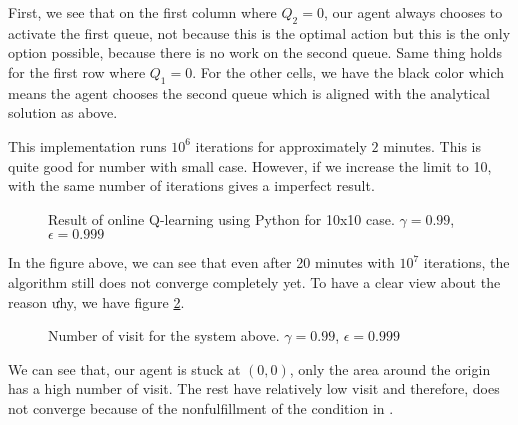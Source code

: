 \documentclass[
  a4paper, xcolor = usenames,dvipsnames]{article}
\begin{document}
First, we see that on the first column where \(Q_{2} = 0\), our agent always chooses to activate the first queue, not because this is the optimal action but this is the only option possible, because there is no work on the second queue. Same thing holds for the first row where \(Q_{1} = 0\). For the other cells, we have the black color which means the agent chooses the second queue which is aligned with the analytical solution as above.

This implementation runs \(10^6\) iterations for approximately \(2\) minutes. This is quite good for number with small case. However, if we increase the limit to 10, with the same number of iterations gives a imperfect result.

\begin{figure}

{\centering {}

}

\caption{Result of online Q-learning using Python for 10x10 case. $\gamma = 0.99$, $\epsilon = 0.999$}\label{fig:10x10-python}
\end{figure}

In the figure above, we can see that even after 20 minutes with \(10^7\) iterations, the algorithm still does not converge completely yet. To have a clear view about the reason ưhy, we have figure \ref{fig:10x10-python-n-visit}.

\begin{figure}

{\centering {}

}

\caption{Number of visit for the system above. $\gamma = 0.99$, $\epsilon = 0.999$}\label{fig:10x10-python-n-visit}
\end{figure}

We can see that, our agent is stuck at \((0, 0)\), only the area around the origin has a high number of visit. The rest have relatively low visit and therefore, does not converge because of the nonfulfillment of the condition in \autocite{q-learning-converge}.
\end{document}

